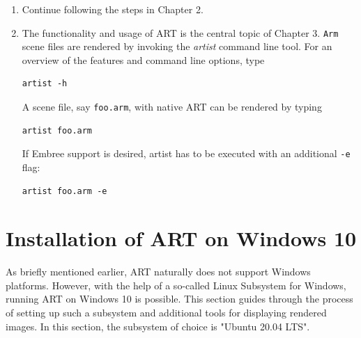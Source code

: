 \begin{enumerate}
	 
	\item Continue following the steps in Chapter 2. 
	
	\item The functionality and usage of ART is the central topic of Chapter 3.
     \texttt{Arm} scene files are rendered by invoking the \emph{artist} command line tool. For an overview of the features and command line options, type
     \begin{Verbatim}
artist -h
     \end{Verbatim} 
     
	 A scene file, say \texttt{foo.arm}, with native ART can be rendered by typing
	 \begin{Verbatim}
artist foo.arm 
	 \end{Verbatim}
	 If Embree support is desired, artist has to be executed with an additional \texttt{-e} flag:
	 \begin{Verbatim}
artist foo.arm -e
	 \end{Verbatim}

	
\end{enumerate} 



\section{Installation of ART on Windows 10}
As briefly mentioned earlier, ART naturally does not support Windows platforms. However, with the help of a so-called Linux Subsystem for Windows, running ART on Windows 10 is possible. This section guides through the process of setting up such a subsystem and additional tools for displaying rendered images. In this section, the subsystem of choice is "Ubuntu 20.04 LTS".


